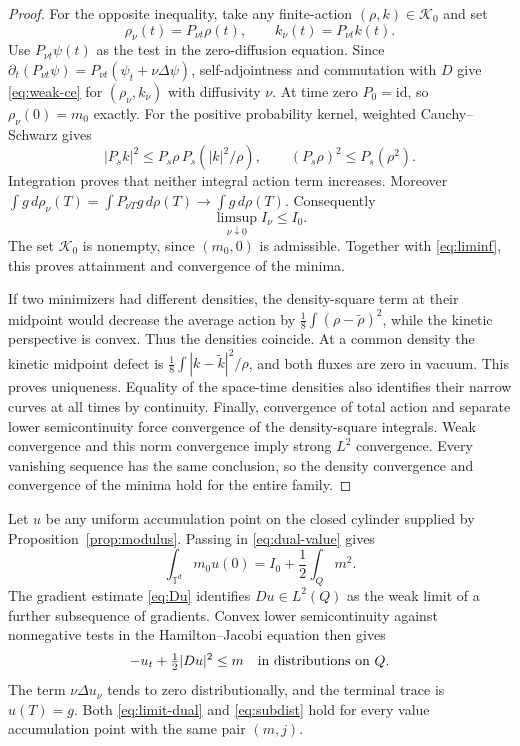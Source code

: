 \documentclass[11pt]{article}
\newcommand{\T}{\mathbb T}
\numberwithin{equation}{section}
\begin{document}
\begin{proof}
For the opposite inequality, take any finite-action
\((\rho,k)\in\mathcal K_0\) and set
\begin{equation}\label{eq:recovery}
 \rho_\nu(t)=P_{\nu t}\rho(t),\qquad
 k_\nu(t)=P_{\nu t}k(t).
\end{equation}
Use \(P_{\nu t}\psi(t)\) as the test in the zero-diffusion equation.
Since
\(\partial_t(P_{\nu t}\psi)=P_{\nu t}(\psi_t+\nu\Delta\psi)\),
self-adjointness and commutation with \(D\) give
\eqref{eq:weak-ce} for \((\rho_\nu,k_\nu)\) with diffusivity \(\nu\).
At time zero \(P_0=\mathrm{id}\), so \(\rho_\nu(0)=m_0\) exactly.
For the positive probability kernel, weighted Cauchy--Schwarz gives
\[
 |P_s k|^2\le P_s\rho\,P_s(|k|^2/\rho),\qquad
 (P_s\rho)^2\le P_s(\rho^2).
\]
Integration proves that neither integral action term increases.
Moreover
\(\int g\,d\rho_\nu(T)=\int P_{\nu T}g\,d\rho(T)\to\int g\,d\rho(T)\).
Consequently
\[
 \limsup_{\nu\downarrow0}I_\nu\le I_0 .
\]
The set \(\mathcal K_0\) is nonempty, since \((m_0,0)\) is admissible.
Together with \eqref{eq:liminf}, this proves attainment and convergence
of the minima.

If two minimizers had different densities, the density-square term
at their midpoint would decrease the average action by
\(\frac18\int(\rho-\widetilde\rho)^2\), while the kinetic perspective
is convex. Thus the densities coincide. At a common density the
kinetic midpoint defect is
\(\frac18\int|k-\widetilde k|^2/\rho\), and both fluxes are zero
in vacuum. This proves uniqueness. Equality of the space-time densities
also identifies their narrow curves at all times by continuity.
Finally, convergence of total action and separate lower semicontinuity
force convergence of the density-square integrals. Weak convergence
and this norm convergence imply strong \(L^2\) convergence. Every
vanishing sequence has the same conclusion, so the density convergence
and convergence of the minima hold for the entire family.
\end{proof}

Let \(u\) be any uniform accumulation point on the closed cylinder supplied
by Proposition~\ref{prop:modulus}. Passing in \eqref{eq:dual-value} gives
\begin{equation}\label{eq:limit-dual}
 \int_{\T^d}m_0u(0)=I_0+\frac12\int_Qm^2 .
\end{equation}
The gradient estimate \eqref{eq:Du} identifies \(Du\in L^2(Q)\) as the
weak limit of a further subsequence of gradients. Convex lower
semicontinuity against nonnegative tests in the Hamilton--Jacobi equation
then gives
\begin{equation}\label{eq:subdist}
 -u_t+\tfrac12|Du|^2\le m \quad\hbox{in distributions on }Q .
\end{equation}
The term \(\nu\Delta u_\nu\) tends to zero distributionally, and
the terminal trace is \(u(T)=g\). Both \eqref{eq:limit-dual} and
\eqref{eq:subdist} hold for every value accumulation point with the same
pair \((m,j)\).
\end{document}
